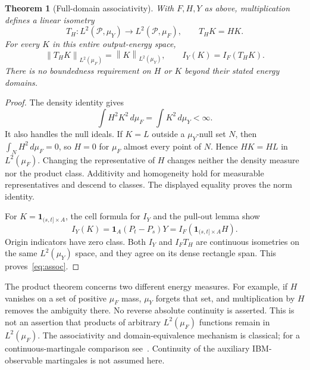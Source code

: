 \documentclass[11pt]{article}
\newtheorem{theorem}{Theorem}[section]
\theoremstyle{remark}\newtheorem{remark}[theorem]{Remark}
\newcommand{\one}{\mathbf1}
\newcommand{\norm}[1]{\left\lVert#1\right\rVert}
\newcommand{\PP}{\mathcal P}
\begin{document}
\begin{theorem}[Full-domain associativity]\label{thm:associativity}
With $F,H,Y$ as above, multiplication defines a linear isometry
\[
 T_H:L^2(\PP,\mu_Y)\longrightarrow L^2(\PP,\mu_F),
 \qquad T_HK=HK.
\]
For every $K$ in this entire output-energy space,
\begin{equation}\label{eq:assoc}
 \norm{T_HK}_{L^2(\mu_F)}=\norm K_{L^2(\mu_Y)},
 \qquad I_Y(K)=I_F(T_HK).
\end{equation}
There is no boundedness requirement on $H$ or $K$ beyond their stated
energy domains.
\end{theorem}
\begin{proof}
The density identity gives
\[
 \int H^2K^2\,d\mu_F=\int K^2\,d\mu_Y<\infty.
\]
It also handles the null ideals. If $K=L$ outside a $\mu_Y$-null
set $N$, then $\int_N H^2\,d\mu_F=0$, so $H=0$ for
$\mu_F$ almost every point of $N$. Hence $HK=HL$ in $L^2(\mu_F)$.
Changing the representative of $H$ changes neither the density measure
nor the product class. Additivity and homogeneity hold for measurable
representatives and descend to classes. The displayed equality proves
the norm identity.

For $K=\one_{(s,t]\times A}$, the cell formula for $I_Y$ and the
pull-out lemma show
\[
 I_Y(K)=\one_A(P_t-P_s)Y=I_F(\one_{(s,t]\times A}H).
\]
Origin indicators have zero class. Both $I_Y$ and $I_FT_H$ are continuous
isometries on the same $L^2(\mu_Y)$ space, and they agree on its dense
rectangle span. This proves~\eqref{eq:assoc}.
\end{proof}

The product theorem concerns two different energy measures. For example,
if $H$ vanishes on a set of positive $\mu_F$ mass, $\mu_Y$ forgets
that set, and multiplication by $H$ removes the ambiguity there. No
reverse absolute continuity is asserted. This is not an assertion that
products of arbitrary $L^2(\mu_F)$ functions remain in $L^2(\mu_F)$.
The associativity and domain-equivalence mechanism is classical; for a
continuous-martingale comparison see~\cite[Proposition 5.4]{Liao}.
Continuity of the auxiliary IBM-observable martingales is not assumed
here.
\end{document}
